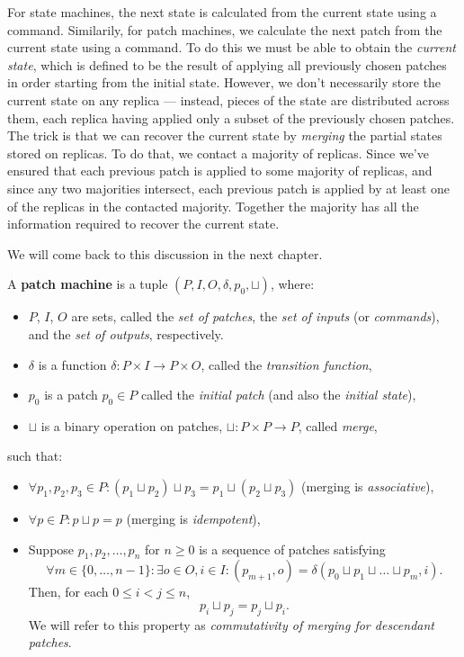 \documentclass[12pt,a4paper,en]{pracamgr}
\newcommand{\tb}[1]{\textbf{#1}}
\newcommand{\ti}[1]{\textit{#1}}
\begin{document}
For state machines, the next state is calculated from the current state using a command. Similarily, for patch machines, we calculate the next patch from the current state using a command. To do this we must be able to obtain the \ti{current state}, which is defined to be the result of applying all previously chosen patches in order starting from the initial state. However, we don't necessarily store the current state on any replica --- instead, pieces of the state are distributed across them, each replica having applied only a subset of the previously chosen patches. The trick is that we can recover the current state by \ti{merging} the partial states stored on replicas. To do that, we contact a majority of replicas. Since we've ensured that each previous patch is applied to some majority of replicas, and since any two majorities intersect, each previous patch is applied by at least one of the replicas in the contacted majority. Together the majority has all the information required to recover the current state.

We will come back to this discussion in the next chapter.

\begin{defin}
	A \tb{patch machine} is a tuple $(P, I, O, \delta, p_0, \sqcup)$, where:
	\begin{itemize}
		\item $P$, $I$, $O$ are sets, called the \ti{set of patches}, the \ti{set of inputs} (or \ti{commands}), and the \ti{set of outputs}, respectively.
		\item $\delta$ is a function $\delta: P \times I \rightarrow P \times O$, called the \ti{transition function},
        \item $p_0$ is a patch $p_0 \in P$ called the \ti{initial patch} (and also the \ti{initial state}),
		\item $\sqcup$ is a binary operation on patches, $\sqcup: P \times P \rightarrow P$, called \ti{merge},
	\end{itemize}
	such that:
	\begin{itemize}
        \item $\forall p_1, p_2, p_3 \in P: (p_1 \sqcup p_2) \sqcup p_3 = p_1 \sqcup (p_2 \sqcup p_3)$ (merging is \ti{associative}),
        \item $\forall p \in P: p \sqcup p = p$ (merging is \ti{idempotent}),
		\item Suppose $p_1, p_2, \dots, p_n$ for $n \ge 0$ is a sequence of patches satisfying
			$$ \forall m \in \{0, \dots, n-1\}: \exists o \in O, i \in I: (p_{m+1}, o) = \delta(p_0 \sqcup p_1 \sqcup \dots \sqcup p_m, i). $$
			Then, for each $0 \le i < j \le n$,
			$$ p_i \sqcup p_j = p_j \sqcup p_i. $$
			We will refer to this property as \ti{commutativity of merging for descendant patches}.
	\end{itemize}
\end{defin}
\end{document}
